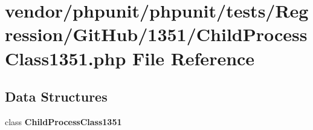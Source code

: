 \section{vendor/phpunit/phpunit/tests/\+Regression/\+Git\+Hub/1351/\+Child\+Process\+Class1351.php File Reference}
\label{_child_process_class1351_8php}
\subsection*{Data Structures}
\begin{DoxyCompactItemize}
\item 
class {\bf Child\+Process\+Class1351}
\end{DoxyCompactItemize}
